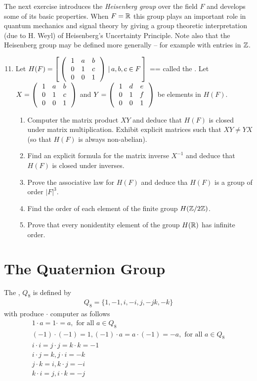 \documentclass[10pt,a4paper]{report}
\begin{document}
The next exercise introduces the \textit{Heisenberg group} over the field $F$ and develops some of its basic properties.  When $F = \mathbb{R}$ this group plays an important role in quantum mechanics and signal theory by giving a group theoretic interpretation (due to H. Weyl) of Heisenberg's Uncertainty Principle.  Note also that the Heisenberg group may be defined more generally -- for example with entries in $\mathbb{Z}$.

\begin{enumerate}
	\setcounter{enumi}{10}
	\item Let $H(F) = \left [\, \left (\,  \begin{array}{c c c} 1&a&b \\ 0 & 1 & c \\ 0 & 0 & 1 \end{array}  \,\right ) \,|\,a,b,c \in F \,\right ]$ == called the .  Let $X=\left (\,  \begin{array}{c c c} 1&a&b \\ 0 & 1 & c \\ 0 & 0 & 1 \end{array}  \,\right )$ and $Y = \left (\,  \begin{array}{c c c} 1&d&e \\ 0 & 1 & f \\ 0 & 0 & 1 \end{array}  \,\right )$ be elements in $H(F)$.
	\begin{enumerate}
		\item Computer the matrix product $XY$ and deduce that $H(F)$ is closed under matrix multiplication.  Exhibit explicit matrices such that $XY\ne YX$ (so that $H(F)$ is always non-abelian).
		
		\item Find an explicit formula for the matrix inverse $X^{-1}$ and deduce that $H(F)$ is closed under inverses.
		
		\item Prove the associative law for $H(F)$ and deduce tha $H(F)$ is a group of order $|F|^3$.
		
		\item Find the order of each element of the finite group $H(\mathbb{Z}/2\mathbb{Z})$.
		
		\item Prove that every nonidentity element of the group $H(\mathbb{R})$ has infinite order.
	\end{enumerate}
\end{enumerate}

\section{The Quaternion Group}

\begin{definition}The , $Q_8$ is defined by 
\begin{align*}
	Q_8=\{1,-1,i,-i,j,-jk,-k\}
\end{align*}with produce $\cdot$ computer as follows
\begin{align*}
	1\cdot a=1\cdot =a, \text{ for all }a \in Q_8\\
	(-1)\cdot(-1) = 1, (-1)\cdot a=a \cdot (-1) = -a, \text{ for all } a \in Q_8 \\
	i \cdot i = j \cdot j = k \cdot k = -1 \\
	i \cdot j = k, j \cdot i = -k \\
	j \cdot k = i, k \cdot j = -i \\
	k \cdot i = j, i \cdot k = -j
\end{align*}

\end{definition}
\end{document}
